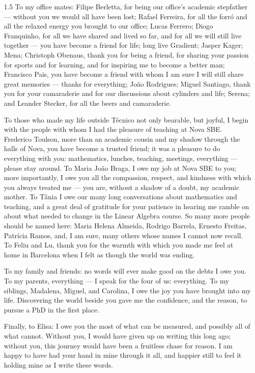 \documentclass{amsbook}
\begin{document}
\begin{spacing}{1.5}
To my office mates: Filipe Berletta, for being our office's academic stepfather — without you we would all have been lost; Rafael Ferreira, for all the forró and all the relaxed energy you brought to our office; Lucas Ferrero; Diogo Franquinho, for all we have shared and lived so far, and for all we will still live together — you have become a friend for life; long live Gradient; Jasper Kager; Mena; Christoph Obenaus, thank you for being a friend, for sharing your passion for sports and for learning, and for inspiring me to become a better man; Francisco Pais, you have become a friend with whom I am sure I will still share great memories — thanks for everything; João Rodrigues; Miguel Santiago, thank you for your camaraderie and for our discussions about cylinders and life; Serena; and Leander Stecker, for all the beers and camaraderie.


To those who made my life outside Técnico not only bearable, but joyful, I begin with the people with whom I had the pleasure of teaching at Nova SBE. Frederico Toulson, more than an academic cousin and my shadow through the halls of Nova, you have become a trusted friend; it was a pleasure to do everything with you: mathematics, lunches, teaching, meetings, everything — please stay around. To Maria João Braga, I owe my job at Nova SBE to you; more importantly, I owe you all the compassion, respect, and kindness with which you always treated me — you are, without a shadow of a doubt, my academic mother. To Tânia I owe our many long conversations about mathematics and teaching, and a great deal of gratitude for your patience in hearing me ramble on about what needed to change in the Linear Algebra course. So many more people should be named here: Maria Helena Almeida, Rodrigo Barrela, Ernesto Freitas, Patrícia Ramos, and, I am sure, many others whose names I cannot now recall. To Feliu and Lu, thank you for the warmth with which you made me feel at home in Barcelona when I felt as though the world was ending.


To my family and friends: no words will ever make good on the debts I owe you. To my parents, everything — I speak for the four of us: everything. To my siblings, Madalena, Miguel, and Carolina, I owe the joy you have brought into my life. Discovering the world beside you gave me the confidence, and the reason, to pursue a PhD in the first place.

Finally, to Elisa: I owe you the most of what can be measured, and possibly all of what cannot. Without you, I would have given up on writing this long ago; without you, this journey would have been a fruitless chase for reason. I am happy to have had your hand in mine through it all, and happier still to feel it holding mine as I write these words.



\end{spacing}
\end{document}
